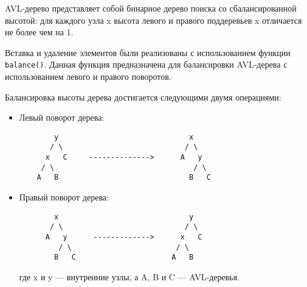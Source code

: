 \documentclass[12pt]{article}
\begin{document}
AVL-дерево представляет собой бинарное дерево поиска со сбалансированной высотой: для каждого узла x высота левого и правого поддеревьев x отличается не более чем на 1.

Вставка и удаление элементов были реализованы с использованием функции \texttt{balance()}. Данная функция предназначена для балансировки AVL-дерева с использованием левого и правого поворотов. 

Балансировка высоты дерева достигается следующими двумя операциями:
\begin{itemize}
    \item
    Левый поворот дерева:
    \begin{verbatim}
        y                              x
       / \                            / \
      x   C     -------------->      A   y
     / \                                / \
    A   B                              B   C
    \end{verbatim}
    \item
    Правый поворот дерева:
    \begin{verbatim}
        x                              y
       / \                            / \
      A   y      ------------->      x   C
         / \                        / \
        B   C                      A   B
    \end{verbatim}
    где x и y — внутренние узлы, а A, B и C — AVL-деревья. 
\end{itemize}
\end{document}
